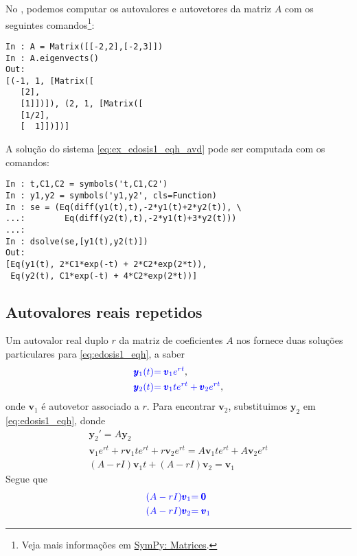 \begin{ex}
\ifispython
No \python, podemos computar os autovalores e autovetores da matriz $A$ com os seguintes comandos\footnote{Veja mais informações em \href{https://docs.sympy.org/latest/tutorial/matrices.html}{SymPy: Matrices}.}:
\begin{verbatim}
In : A = Matrix([[-2,2],[-2,3]])
In : A.eigenvects()
Out: 
[(-1, 1, [Matrix([
   [2],
   [1]])]), (2, 1, [Matrix([
   [1/2],
   [  1]])])]
\end{verbatim}

A solução do sistema \eqref{eq:ex_edosis1_eqh_avd} pode ser computada com os comandos:
\begin{verbatim}
In : t,C1,C2 = symbols('t,C1,C2')
In : y1,y2 = symbols('y1,y2', cls=Function)
In : se = (Eq(diff(y1(t),t),-2*y1(t)+2*y2(t)), \
...:        Eq(diff(y2(t),t),-2*y1(t)+3*y2(t)))
...: 
In : dsolve(se,[y1(t),y2(t)])
Out: 
[Eq(y1(t), 2*C1*exp(-t) + 2*C2*exp(2*t)),
 Eq(y2(t), C1*exp(-t) + 4*C2*exp(2*t))]
\end{verbatim}
\fi
\end{ex}

\subsection{Autovalores reais repetidos}

Um autovalor real duplo $r$ da matriz de coeficientes $A$ nos fornece duas soluções particulares para \eqref{eq:edosis1_eqh}, a saber
\begin{align}
  {\color{blue}\pmb{y}_1(t)} &{\color{blue}= \pmb{v}_1e^{rt}},\\
  {\color{blue}\pmb{y}_2(t)} &{\color{blue}= \pmb{v}_1te^{rt} + \pmb{v}_2e^{rt}},
\end{align}
onde $\pmb{v}_1$ é autovetor associado a $r$. Para encontrar $\pmb{v}_2$, substituimos $\pmb{y}_2$ em \eqref{eq:edosis1_eqh}, donde
\begin{gather}
  \pmb{y}_2' = A\pmb{y}_2 \\
  \pmb{v}_1e^{rt} + r\pmb{v}_1te^{rt} + r\pmb{v}_2e^{rt} = A\pmb{v}_1te^{rt} + A\pmb{v}_2e^{rt} \\
  (A-rI)\pmb{v}_1t + (A-rI)\pmb{v}_2 = \pmb{v}_1
\end{gather}
Segue que
\begin{align}
  {\color{blue}(A-rI)\pmb{v}_1} &{\color{blue}= \pmb{0}} \\
  {\color{blue}(A-rI)\pmb{v}_2} &{\color{blue}= \pmb{v}_1}
\end{align}

